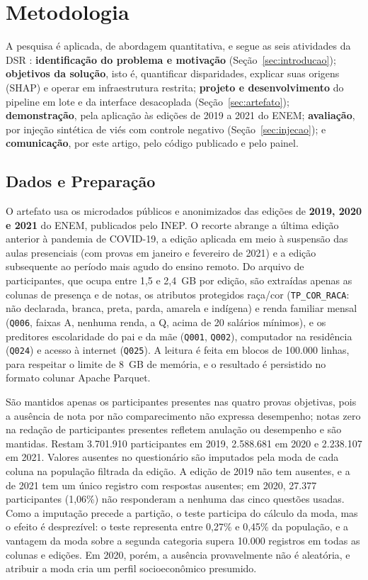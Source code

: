 \section{Metodologia}
\label{sec:metodologia}

A pesquisa é aplicada, de abordagem quantitativa, e segue as seis atividades da DSR \cite{peffers2007design}: \textbf{identificação do problema e motivação} (Seção~\ref{sec:introducao}); \textbf{objetivos da solução}, isto é, quantificar disparidades, explicar suas origens (SHAP) e operar em infraestrutura restrita; \textbf{projeto e desenvolvimento} do pipeline em lote e da interface desacoplada (Seção~\ref{sec:artefato}); \textbf{demonstração}, pela aplicação às edições de 2019 a 2021 do ENEM; \textbf{avaliação}, por injeção sintética de viés com controle negativo (Seção~\ref{sec:injecao}); e \textbf{comunicação}, por este artigo, pelo código publicado e pelo painel.

\subsection{Dados e Preparação}
\label{sec:dados}

O artefato usa os microdados públicos e anonimizados das edições de \textbf{2019, 2020 e 2021} do ENEM, publicados pelo INEP. O recorte abrange a última edição anterior à pandemia de COVID-19, a edição aplicada em meio à suspensão das aulas presenciais (com provas em janeiro e fevereiro de 2021) e a edição subsequente ao período mais agudo do ensino remoto. Do arquivo de participantes, que ocupa entre 1,5 e 2,4~GB por edição, são extraídas apenas as colunas de presença e de notas, os atributos protegidos raça/cor (\texttt{TP\_COR\_RACA}: não declarada, branca, preta, parda, amarela e indígena) e renda familiar mensal (\texttt{Q006}, faixas A, nenhuma renda, a Q, acima de 20 salários mínimos), e os preditores escolaridade do pai e da mãe (\texttt{Q001}, \texttt{Q002}), computador na residência (\texttt{Q024}) e acesso à internet (\texttt{Q025}). A leitura é feita em blocos de 100.000 linhas, para respeitar o limite de 8~GB de memória, e o resultado é persistido no formato colunar Apache Parquet.

São mantidos apenas os participantes presentes nas quatro provas objetivas, pois a ausência de nota por não comparecimento não expressa desempenho; notas zero na redação de participantes presentes refletem anulação ou desempenho e são mantidas. Restam 3.701.910 participantes em 2019, 2.588.681 em 2020 e 2.238.107 em 2021. Valores ausentes no questionário são imputados pela moda de cada coluna na população filtrada da edição. A edição de 2019 não tem ausentes, e a de 2021 tem um único registro com respostas ausentes; em 2020, 27.377 participantes (1,06\%) não responderam a nenhuma das cinco questões usadas. Como a imputação precede a partição, o teste participa do cálculo da moda, mas o efeito é desprezível: o teste representa entre 0,27\% e 0,45\% da população, e a vantagem da moda sobre a segunda categoria supera 10.000 registros em todas as colunas e edições. Em 2020, porém, a ausência provavelmente não é aleatória, e atribuir a moda cria um perfil socioeconômico presumido.

